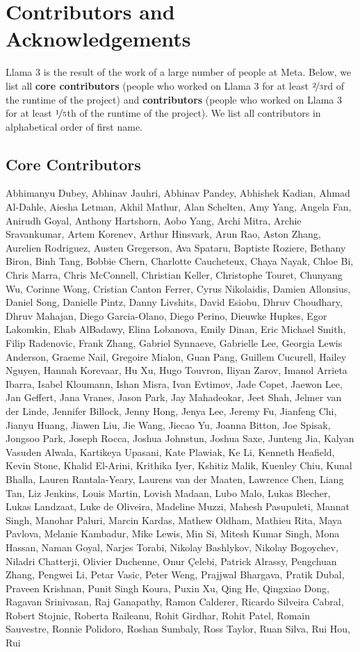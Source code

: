 \section*{Contributors and Acknowledgements}
Llama 3 is the result of the work of a large number of people at Meta.
Below, we list all \textbf{core contributors} (people who worked on Llama 3 for at least $\nicefrac{2}{3}$rd of the runtime of the project) and \textbf{contributors} (people who worked on Llama 3 for at least $\nicefrac{1}{5}$th of the runtime of the project).
We list all contributors in alphabetical order of first name.

\subsection*{Core Contributors}
Abhimanyu Dubey, Abhinav Jauhri, Abhinav Pandey, Abhishek Kadian, Ahmad Al-Dahle, Aiesha Letman, Akhil Mathur, Alan Schelten, Amy Yang, Angela Fan, Anirudh Goyal, Anthony Hartshorn, Aobo Yang, Archi Mitra, Archie Sravankumar, Artem Korenev, Arthur Hinsvark, Arun Rao, Aston Zhang, Aurelien Rodriguez, Austen Gregerson, Ava Spataru, Baptiste Roziere, Bethany Biron, Binh Tang, Bobbie Chern, Charlotte Caucheteux, Chaya Nayak, Chloe Bi, Chris Marra, Chris McConnell, Christian Keller, Christophe Touret, Chunyang Wu, Corinne Wong, Cristian Canton Ferrer, Cyrus Nikolaidis, Damien Allonsius, Daniel Song, Danielle Pintz, Danny Livshits, David Esiobu, Dhruv Choudhary, Dhruv Mahajan, Diego Garcia-Olano, Diego Perino, Dieuwke Hupkes, Egor Lakomkin, Ehab AlBadawy, Elina Lobanova, Emily Dinan, Eric Michael Smith, Filip Radenovic, Frank Zhang, Gabriel Synnaeve, Gabrielle Lee, Georgia Lewis Anderson, Graeme Nail, Gregoire Mialon, Guan Pang, Guillem Cucurell, Hailey Nguyen, Hannah Korevaar, Hu Xu, Hugo Touvron, Iliyan Zarov, Imanol Arrieta Ibarra, Isabel Kloumann, Ishan Misra, Ivan Evtimov, Jade Copet, Jaewon Lee, Jan Geffert, Jana Vranes, Jason Park, Jay Mahadeokar, Jeet Shah, Jelmer van der Linde, Jennifer Billock, Jenny Hong, Jenya Lee, Jeremy Fu, Jianfeng Chi, Jianyu Huang, Jiawen Liu, Jie Wang, Jiecao Yu, Joanna Bitton, Joe Spisak, Jongsoo Park, Joseph Rocca, Joshua Johnstun, Joshua Saxe, Junteng Jia, Kalyan Vasuden Alwala, Kartikeya Upasani, Kate Plawiak, Ke Li, Kenneth Heafield, Kevin Stone, Khalid El-Arini, Krithika Iyer, Kshitiz Malik, Kuenley Chiu, Kunal Bhalla, Lauren Rantala-Yeary, Laurens van der Maaten, Lawrence Chen, Liang Tan, Liz Jenkins, Louis Martin, Lovish Madaan, Lubo Malo, Lukas Blecher, Lukas Landzaat, Luke de Oliveira, Madeline Muzzi, Mahesh Pasupuleti, Mannat Singh, Manohar Paluri, Marcin Kardas, Mathew Oldham, Mathieu Rita, Maya Pavlova, Melanie Kambadur, Mike Lewis, Min Si, Mitesh Kumar Singh, Mona Hassan, Naman Goyal, Narjes Torabi, Nikolay Bashlykov, Nikolay Bogoychev, Niladri Chatterji, Olivier Duchenne, Onur Çelebi, Patrick Alrassy, Pengchuan Zhang, Pengwei Li, Petar Vasic, Peter Weng, Prajjwal Bhargava, Pratik Dubal, Praveen Krishnan, Punit Singh Koura, Puxin Xu, Qing He, Qingxiao Dong, Ragavan Srinivasan, Raj Ganapathy, Ramon Calderer, Ricardo Silveira Cabral, Robert Stojnic, Roberta Raileanu, Rohit Girdhar, Rohit Patel, Romain Sauvestre, Ronnie Polidoro, Roshan Sumbaly, Ross Taylor, Ruan Silva, Rui Hou, Rui 